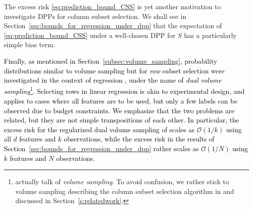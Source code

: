 \documentclass[twoside,11pt]{book}
\newcommand{\rev}[1]{\textcolor{black}{#1}}
\numberwithin{theorem}{chapter}
\numberwithin{definition}{chapter}
\numberwithin{proposition}{chapter}
\numberwithin{corollary}{chapter}
\numberwithin{example}{chapter}
\numberwithin{lemma}{chapter}
\numberwithin{assumption}{chapter}
\numberwithin{equation}{chapter}
\numberwithin{figure}{chapter}
\DeclareMathOperator{\Det}{Det}
\DeclareMathOperator{\Span}{\mathrm{Span}}
\DeclareMathOperator{\Prb}{\mathbb{P}}
\begin{document}
The excess risk \eqref{eq:prediction_bound_CSS} is yet another motivation to investigate DPPs for column subset selection. We shall see in Section~\ref{sec:bounds_for_regression_under_dpp} that the expectation of \eqref{eq:prediction_bound_CSS} under a well-chosen DPP for $S$ has a particularly simple bias term.

\rev{
Finally, as mentioned in Section~\ref{subsec:volume_sampling}, probability distributions similar to volume sampling but for \emph{row} subset selection were investigated in the context of regression \citep{DeWa17,DeWaHs18}, under the name of \emph{dual volume sampling}\footnote{\cite{DeWa17} actually talk of \emph{volume sampling}. To avoid confusion, we rather stick to volume sampling describing the column subset selection algorithm in \citep{DRVW06} and discussed in Section~\ref{s:relatedwork}.}. Selecting rows in linear regression is akin to experimental design, and applies to cases where all features are to be used, but only a few labels can be observed due to budget constraints. We emphasize that the two problems are related, but they are not simple transpositions of each other. In particular, the excess risk for the regularized dual volume sampling of \cite{DeWa18} scales as $\mathcal{O}(1/k)$ using all $d$ features and $k$ observations, while the excess risk in the results of Section~\ref{sec:bounds_for_regression_under_dpp} rather scales as $\mathcal{O}(1/N)$ using $k$ features and $N$ observations.
}%
%

\end{document}
